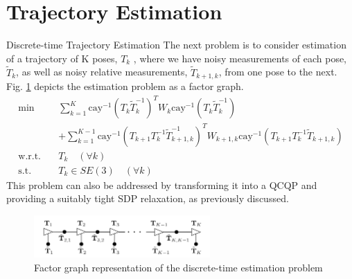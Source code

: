 \documentclass[8pt]{beamer}
\begin{document}
\section{Trajectory Estimation}
\begin{frame}{Discrete-time Trajectory Estimation}
The next problem is to consider estimation of a trajectory of K poses, \(T_k\) , where we have noisy measurements of each pose, \(\tilde{T}_k\), as well as noisy relative measurements, \(\tilde{T}_{k+1,k}\), from one pose to the next. Fig. \ref{fig:factor_graph_representation} depicts the estimation problem as a factor graph.
\begin{equation}
\begin{aligned}
\text{min} \quad & \sum_{k=1}^{K} {\text{cay}^{-1}}\left(T_k \tilde{T}_k^{-1}\right)^T W_k {\text{cay}^{-1}}\left(T_k \tilde{T}_k^{-1}\right) \\
& + \sum_{k=1}^{K-1} {\text{cay}^{-1}}\left(T_{k+1} T_k^{-1} \tilde{T}_{k+1,k}^{-1}\right)^T W_{k+1,k} {\text{cay}^{-1}}\left(T_{k+1} T_k^{-1} \tilde{T}_{k+1,k}\right) \\
\text{w.r.t.} \quad & T_k \quad (\forall k) \\
\text{s.t.} \quad & T_k \in SE(3) \quad (\forall k)
\end{aligned}
\end{equation}
This problem can also be addressed by transforming it into a QCQP and providing a suitably tight SDP relaxation, as previously discussed.

\begin{figure}
    \centering
    \includegraphics[width=0.6\textwidth]{figures/factor_graph_representation.png}
    \caption{Factor graph representation of the discrete-time estimation problem}
    \label{fig:factor_graph_representation}
\end{figure}
\end{frame}
\end{document}
